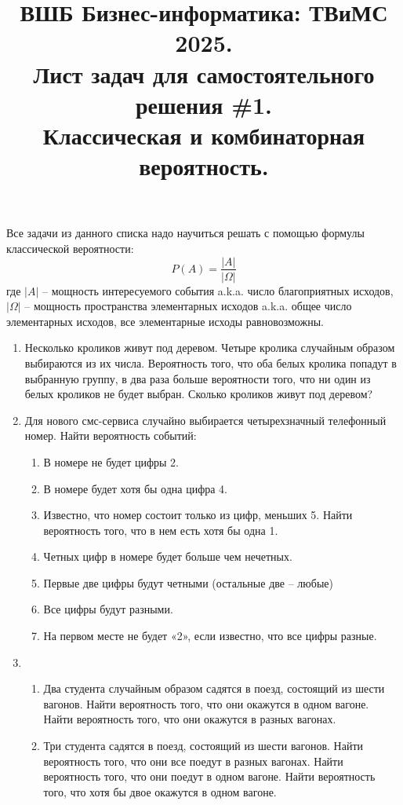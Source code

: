 \documentclass{article}
\title{ВШБ Бизнес-информатика: ТВиМС 2025. \\ Лист задач для самостоятельного решения \#1. \\ Классическая и комбинаторная вероятность.}
\date{}
\author{}
\begin{document}
\maketitle
Все задачи из данного списка надо научиться решать с помощью формулы классической вероятности:
$$
    P(A) = \frac{|A|}{|\Omega|}
$$
где $|A|$ -- мощность интересуемого события a.k.a. число благоприятных исходов, $|\Omega|$ -- мощность пространства элементарных исходов a.k.a. общее число элементарных исходов, все элементарные исходы равновозможны.


\begin{enumerate}

    
    \item Несколько кроликов живут под деревом. Четыре кролика случайным образом выбираются из их числа. Вероятность того, что оба белых кролика попадут в выбранную группу, в два раза больше вероятности того, что ни один из белых кроликов не будет выбран. Сколько кроликов живут под деревом?

    \item Для нового смс-сервиса случайно выбирается четырехзначный телефонный номер. Найти вероятность событий:
    \begin{enumerate}
        \item В номере не будет цифры 2.
        \item В номере будет хотя бы одна цифра 4.
        \item Известно, что номер состоит только из цифр, меньших 5. Найти вероятность того, что в нем есть хотя бы одна 1.
        \item Четных цифр в номере будет больше чем нечетных.
        \item Первые две цифры будут четными (остальные две -- любые)
        \item Все цифры будут разными.
        \item На первом месте не будет «2», если известно, что все цифры разные.
    \end{enumerate}

    \item
    \begin{enumerate}
        \item Два студента случайным образом садятся в поезд, состоящий из шести вагонов. Найти вероятность того, что они окажутся в одном вагоне. Найти вероятность того, что они окажутся в разных вагонах.
        \item Три студента садятся в поезд, состоящий из шести вагонов. Найти вероятность того, что они все поедут в разных вагонах. Найти вероятность того, что они поедут в одном вагоне. Найти вероятность того, что хотя бы двое окажутся в одном вагоне.
    \end{enumerate}


\end{enumerate}
\end{document}
